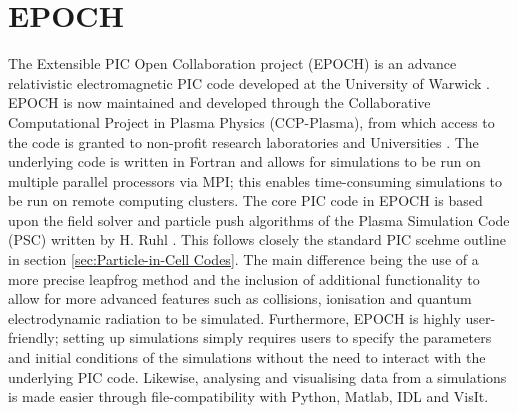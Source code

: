 \section{EPOCH}
The Extensible PIC Open Collaboration project (EPOCH) is an advance relativistic electromagnetic PIC code developed at the University of Warwick \cite{Bennett2015}. EPOCH is now maintained and developed through the Collaborative Computational Project in Plasma Physics (CCP-Plasma), from which access to the code is granted to non-profit research laboratories and Universities \cite{ChrisBRADYKeithBENNETTHolgerSCHMITZ}. 
The underlying code is written in Fortran and allows for simulations to be run on multiple parallel processors via MPI; this enables time-consuming simulations to be run on remote computing clusters. The core PIC code in EPOCH is based upon the field solver and particle push algorithms of the Plasma Simulation Code (PSC) written by H. Ruhl \cite{Ruhl}. This follows closely the standard PIC scehme outline in section \ref{sec:Particle-in-Cell Codes}. The main difference being the use of a more precise leapfrog method and the inclusion of additional functionality to allow for more advanced features such as collisions, ionisation and quantum electrodynamic radiation to be simulated. Furthermore, EPOCH is highly user-friendly; setting up simulations simply requires users to specify the parameters and initial conditions of the simulations without the need to interact with the underlying PIC code. Likewise, analysing and visualising data from a simulations is made easier through file-compatibility with Python, Matlab, IDL and VisIt.
